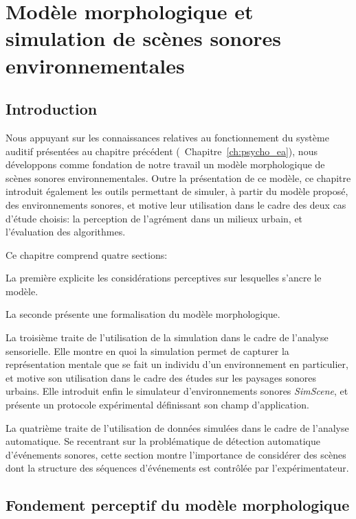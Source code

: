 \chapter[Modèle et simulation]{Modèle morphologique et simulation de scènes sonores environnementales}\label{ch:psycho_model} 

\section{Introduction}

Nous appuyant sur les connaissances relatives au fonctionnement du système auditif présentées au chapitre précédent (\cf~Chapitre~\ref{ch:psycho_ea}), nous développons comme fondation de notre travail un modèle morphologique de scènes sonores environnementales. Outre la présentation de ce modèle, ce chapitre introduit également les outils permettant de simuler, à partir du modèle proposé, des environnements sonores, et motive leur utilisation dans le cadre des deux cas d'étude choisis: la perception de l'agrément dans un milieux urbain, et l'évaluation des algorithmes.

Ce chapitre comprend quatre sections:

La première explicite les considérations perceptives sur lesquelles s'ancre le modèle.

La seconde présente une formalisation du modèle morphologique.

La troisième traite de l'utilisation de la simulation dans le cadre de l'analyse sensorielle. Elle montre en quoi la simulation permet de capturer la représentation mentale que se fait un individu d'un environnement en particulier, et motive son utilisation dans le cadre des études sur les paysages sonores urbains. Elle introduit enfin le simulateur d'environnements sonores \emph{SimScene}, et présente un protocole expérimental définissant son champ d'application.

La quatrième traite de l'utilisation de données simulées dans le cadre de l'analyse automatique. Se recentrant sur la problématique de détection automatique d'événements sonores, cette section montre l'importance de considérer des scènes dont la structure des séquences d'événements est contrôlée par l’expérimentateur.

\section{Fondement perceptif du modèle morphologique}
\label{sec:ch4_model}

